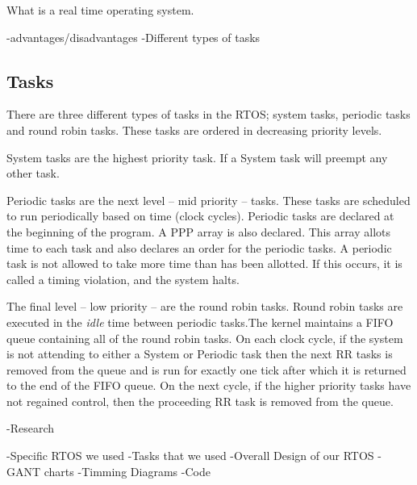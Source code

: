 What is a real time operating system.

-advantages/disadvantages
-Different types of tasks
\subsection{Tasks}

There are three different types of tasks in the RTOS; system tasks, periodic tasks and round robin tasks. These tasks are ordered in decreasing priority levels. \\


System tasks are the highest priority task. If a System task will preempt any other task.\\


Periodic tasks are the next level -- mid priority -- tasks. These tasks are scheduled to run periodically based on time (clock cycles). 
Periodic tasks are declared at the beginning of the program. A PPP array is also declared. This array allots time to each task and also declares an order for the periodic tasks. A periodic task is not allowed to take more time than has been allotted. If this occurs, it is called a timing violation, and the system halts.  \\


The final level -- low priority -- are the round robin tasks. Round robin tasks are executed in the \textit{idle} time between periodic tasks.The kernel maintains a FIFO queue containing all of the round robin tasks. On each clock cycle, if the system is not attending to either a System or Periodic task then the next RR tasks is removed from the queue and is run for exactly one tick after which it is returned to the end of the FIFO queue. On the next cycle, if the higher priority tasks have not regained control, then the proceeding RR task is removed from the queue.  




-Research

-Specific RTOS we used
-Tasks that we used
-Overall Design of our RTOS
-GANT charts
-Timming Diagrams
-Code
